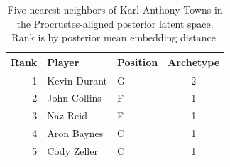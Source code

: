 \begin{table}[htbp]
  \centering\small
  \begin{tabular}{rllc}
    \toprule
    Rank & Player & Position & Archetype \\
    \midrule
    1 & Kevin Durant & G & 2 \\
    2 & John Collins & F & 1 \\
    3 & Naz Reid & F & 1 \\
    4 & Aron Baynes & C & 1 \\
    5 & Cody Zeller & C & 1 \\
    \bottomrule
  \end{tabular}
  \caption{Five nearest neighbors of Karl-Anthony Towns in the Procrustes-aligned posterior latent space. Rank is by posterior mean embedding distance.}
  \label{tab:Karl_Anthony_Towns_neighbors}
\end{table}

